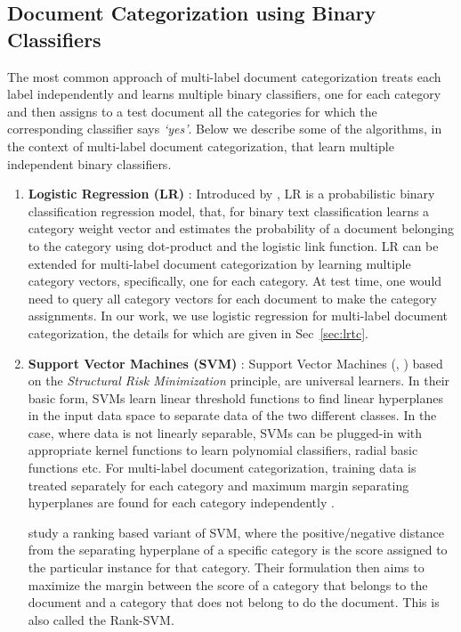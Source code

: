 \subsection{Document Categorization using Binary Classifiers}
\label{sec:rw_multiple_classifiers}
The most common approach of multi-label document categorization treats each label independently and learns multiple binary classifiers, one for each category and then assigns to a test document all the categories for which the corresponding classifier says \emph{`yes'}. Below we describe some of the algorithms, in the context of multi-label document categorization, that learn multiple independent binary classifiers.
\begin{enumerate}
\item{\textbf{Logistic Regression (LR)} : }Introduced by \citep{hosmer1989applied}, LR is a probabilistic binary classification regression model, that, for binary text classification learns a category weight vector and estimates the probability of a document belonging to the category using dot-product and the logistic link function. LR can be extended for multi-label document categorization by learning multiple category vectors, specifically, one for each category. At test time, one would need to query all category vectors for each document to make the category assignments. In our work, we use logistic regression for multi-label document categorization, the details for which are given in Sec~\ref{sec:lrtc}.

\item{\textbf{Support Vector Machines (SVM)} : } Support Vector Machines (\citep{cortes1995support}, \citep{vapnik2000nature}) based on the \emph{Structural Risk Minimization} principle, are universal learners. In their basic form, SVMs learn linear threshold functions to find linear hyperplanes in the input data space to separate data of the two different classes. In the case, where data is not linearly separable, SVMs can be plugged-in with appropriate kernel functions to learn polynomial classifiers, radial basic functions etc. For multi-label document categorization, training data is treated separately for each category and maximum margin separating hyperplanes are found for each category independently \citep{joachims1998text}.

\cite{elisseeff2001kernel} study a ranking based variant of SVM, where the positive/negative distance from the separating hyperplane of a specific category is the score assigned to the particular instance for that category. Their formulation then aims to maximize the margin between the score of a category that belongs to the document and a category that does not belong to do the document. This is also called the Rank-SVM.


\end{enumerate}
